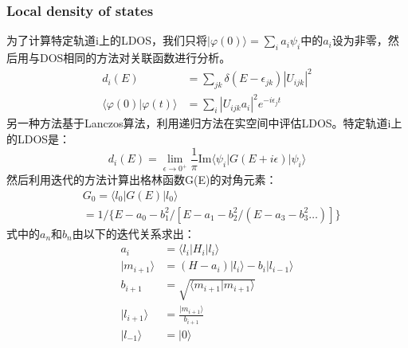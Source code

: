 \subsubsection{Local density of states}
为了计算特定轨道i上的LDOS，我们只将$|\varphi(0)\rangle=\sum_{i}a_{i}\psi_i$中的$a_i$设为非零，然后用与DOS相同的方法对关联函数进行分析。
\begin{align}
    d_i(E)&=\sum_{jk}\delta(E-\epsilon_{jk})|U_{ijk}|^2\\
    \langle \varphi(0)|\varphi(t)\rangle&=\sum_{i}|U_{ijk}a_i|^2e^{-i\epsilon_{j}t}
\end{align}
另一种方法基于Lanczos算法\cite{Haydock_1972}，利用递归方法在实空间中评估LDOS。特定轨道i上的LDOS是：
\begin{equation}
    d_i(E)=\lim_{\epsilon\rightarrow 0^+}\frac{1}{\pi}\text{Im}\langle \psi_i|G(E+i\epsilon)|\psi_i\rangle
\end{equation}
然后利用迭代的方法计算出格林函数G(E)的对角元素：
\begin{equation}
    \begin{aligned}
        &G_0=\langle l_0|G(E)|l_0\rangle\\
        &=1/\{E-a_0-b_1^2/[E-a_1-b_2^2/(E-a_3-b_3^2\dots)]\}
    \end{aligned}
\end{equation}
式中的$a_n$和$b_n$由以下的迭代关系求出：
\begin{equation}
    \begin{aligned}
        a_i&=\langle l_i|H_i|l_i\rangle\\
        |m_{i+1}\rangle&=(H-a_i)|l_i\rangle-b_i|l_{i-1}\rangle\\
        b_{i+1}&=\sqrt{\langle m_{i+1}|m_{i+1}\rangle}\\
        |l_{i+1}\rangle&=\frac{|m_{i+1}\rangle}{b_{i+1}}\\
        |l_{-1}\rangle&=|0\rangle
    \end{aligned}
\end{equation}
